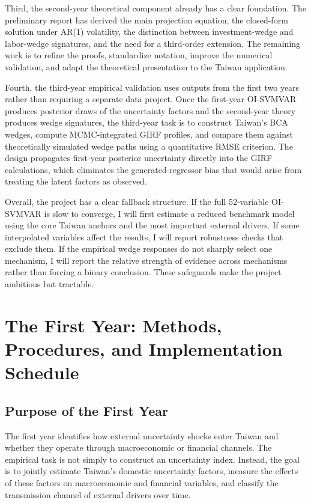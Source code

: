\documentclass[12pt]{article}
\begin{document}
Third, the second-year theoretical component already has a clear foundation. The preliminary
report has derived the main projection equation, the closed-form solution under AR(1) volatility,
the distinction between investment-wedge and labor-wedge signatures, and the need for a
third-order extension. The remaining work is to refine the proofs, standardize notation, improve
the numerical validation, and adapt the theoretical presentation to the Taiwan application.

Fourth, the third-year empirical validation uses outputs from the first two years rather than
requiring a separate data project. Once the first-year OI-SVMVAR produces posterior draws of
the uncertainty factors and the second-year theory produces wedge signatures, the third-year
task is to construct Taiwan's BCA wedges, compute MCMC-integrated GIRF profiles, and compare
them against theoretically simulated wedge paths using a quantitative RMSE criterion. The
design propagates first-year posterior uncertainty directly into the GIRF calculations, which
eliminates the generated-regressor bias that would arise from treating the latent factors as
observed.

Overall, the project has a clear fallback structure. If the full 52-variable OI-SVMVAR is slow to
converge, I will first estimate a reduced benchmark model using the core Taiwan anchors and the
most important external drivers. If some interpolated variables affect the results, I will report
robustness checks that exclude them. If the empirical wedge responses do not sharply select one
mechanism, I will report the relative strength of evidence across mechanisms rather than forcing
a binary conclusion. These safeguards make the project ambitious but tractable.

\section{The First Year: Methods, Procedures, and Implementation Schedule}

\subsection{Purpose of the First Year}

The first year identifies how external uncertainty shocks enter Taiwan and whether they operate
through macroeconomic or financial channels. The empirical task is not simply to construct an
uncertainty index. Instead, the goal is to jointly estimate Taiwan's domestic uncertainty factors,
measure the effects of these factors on macroeconomic and financial variables, and classify the
transmission channel of external drivers over time.
\end{document}
